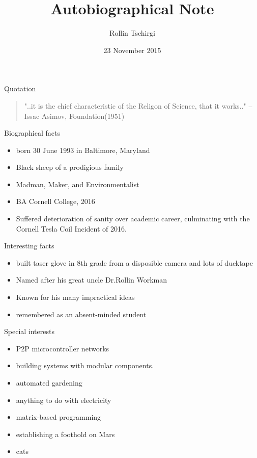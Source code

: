 \documentclass{beamer}
\title{Autobiographical Note}
\author{Rollin Tschirgi}
\institute{Cornell College}
\date{23 November 2015}
\begin{document}
\begin{frame}
  \titlepage
\end{frame}

\begin{frame}{Quotation}
\begin{quotation}
\noindent
"..it is the chief characteristic of the Religon of Science, that it works.."
  \flushright
  --Issac Asimov, Foundation(1951)
  \end{quotation}
\end{frame}

\begin{frame}{Biographical facts}
\begin{itemize}
  \item born 30 June 1993 in Baltimore, Maryland
  \item Black sheep of a prodigious family
  \item Madman, Maker, and Environmentalist
  \item BA Cornell College, 2016
  \item Suffered deterioration of sanity over academic career, culminating with the Cornell Tesla Coil Incident of 2016.
  \end{itemize}
\end{frame}

\begin{frame}{Interesting facts}
\begin{itemize}
  \item built taser glove in 8th grade from a disposible camera and lots of ducktape
  \item Named after his great uncle Dr.Rollin Workman
  \item Known for his many impractical ideas
  \item remembered as an absent-minded student
  \end{itemize}
\end{frame}

\begin{frame}{Special interests}

\begin{itemize}
  \item P2P microcontroller networks
  \item building systems with modular components.
  \item automated gardening
  \item anything to do with electricity
  \item matrix-based programming
  \item establishing a foothold on Mars
  \item cats
\end{itemize}
\end{frame}
\end{document}
